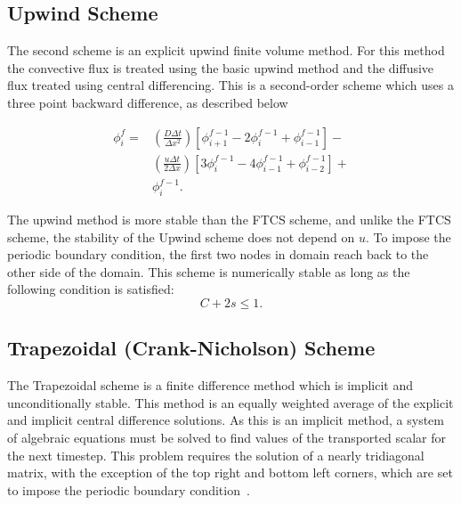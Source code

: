 \documentclass[twocolumn,10pt]{asme2ej}
\begin{document}
\subsection{Upwind Scheme}
The second scheme is an explicit upwind finite volume method. For this method the convective flux is treated using the basic upwind method and the diffusive flux treated using central differencing. This is a second-order scheme which uses a three point backward difference, as described below

\begin{equation}
\label{upwind_eqn}
\begin{split}
\phi_i ^f = & \left( \frac{D \Delta t}{\Delta x^2} \right) \left[ \phi_{i+1} ^{f-1} - 2 \phi_{i} ^{f-1} + \phi_{i-1} ^{f-1} \right] - \\
            & \left( \frac{u \Delta t}{2 \Delta x} \right) \left[ 3 \phi_{i} ^{f-1} - 4 \phi_{i-1} ^{f-1} + \phi_{i-2} ^{f-1} \right] + \\
            & \phi_i ^{f-1}.
\end{split}
\end{equation}

\noindent The upwind method is more stable than the FTCS scheme, and unlike the FTCS scheme, the stability of the Upwind scheme does not depend on $u$. To impose the periodic boundary condition, the first two nodes in domain reach back to the other side of the domain. This scheme is numerically stable as long as the following condition is satisfied:
\begin{equation}
\label{Upwind_stability}
C + 2s \leq 1.
\end{equation}

\subsection{Trapezoidal (Crank-Nicholson) Scheme}
The Trapezoidal scheme is a finite difference method which is implicit and unconditionally stable. This method is an equally weighted average of the explicit and implicit central difference solutions. As this is an implicit method, a system of algebraic equations must be solved to find values of the transported scalar for the next timestep. This problem requires the solution of a nearly tridiagonal matrix, with the exception of the top right and bottom left corners, which are set to impose the periodic boundary condition~\cite{hogarth1990comparative}.
\end{document}
